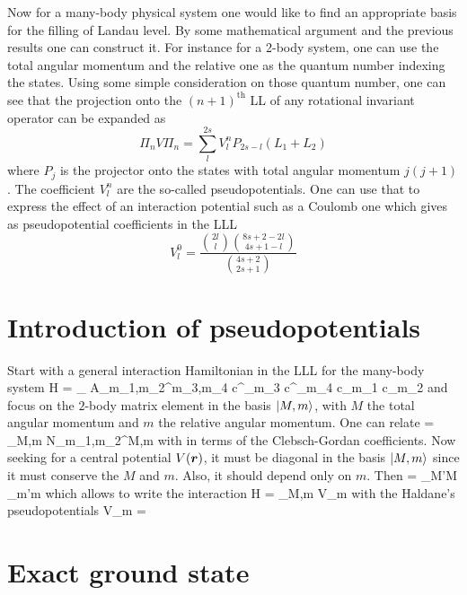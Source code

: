		Now for a many-body physical system one would like to find an appropriate basis for the filling of Landau level. By some mathematical argument and the previous results one can construct it. For instance for a 2-body system, one can use the total angular momentum and the relative one as the quantum number indexing the states. Using some simple consideration on those quantum number, one can see that the projection onto the $(n+1)^\text{th}$ LL of any rotational invariant operator can be expanded as
		\begin{equation}
		    \Pi_nV\Pi_n = \sum_l^{2s}V^n_lP_{2s-l}(L_1+L_2)
		\end{equation}
		where $P_j$ is the projector onto the states with total angular momentum $j(j+1)$. The coefficient $V^n_l$ are the so-called pseudopotentials. One can use that to express the effect of an interaction potential such as a Coulomb one which gives as pseudopotential coefficients in the LLL
		\begin{equation}
		    V^0_l = \frac{\binom{2l}{l}\binom{8s+2-2l}{4s+1-l}}{\binom{4s+2}{2s+1}}
		\end{equation}
	
	\section{Introduction of pseudopotentials}

		Start with a general interaction Hamiltonian in the LLL for the many-body system
		\be \mc H = \sum_{} A_{m_1,m_2}^{m_3,m_4}  c^\dagger_{m_3} c^\dagger_{m_4} c_{m_1} c_{m_2} \ee
		and focus on the $2$-body matrix element in the basis $\ket{M,m}$, with $M$ the total angular momentum and $m$ the relative angular momentum. One can relate
		\be {} = \sum_{M,m} N_{m_1,m_2}^{M,m}  \ee
		with in terms of the Clebsch-Gordan coefficients. Now seeking for a central potential $V(\vb* r)$, it must be diagonal in the basis $\ket{M,m}$ since it must conserve the $M$ and $m$. Also, it should depend only on $m$. Then
		\be {} = \delta_{M'M} \delta_{m'm}  \ee
		which allows to write the interaction
		\be \mc H = \sum_{M,m} V_m  \ee
		with the Haldane's pseudopotentials
		\be V_m =  \ee

	\section{Exact ground state}


